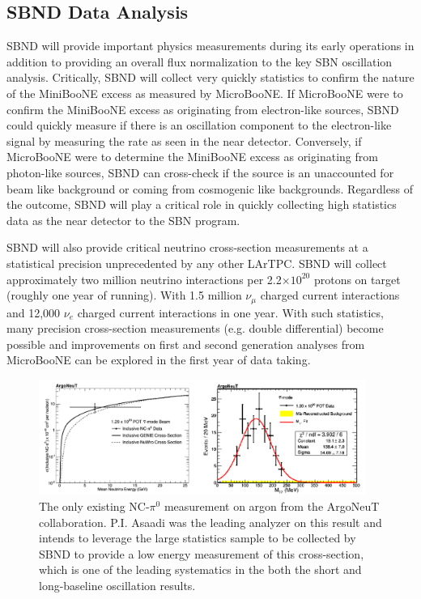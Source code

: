 \subsection{SBND Data Analysis}\label{sec:SBNDDataAnalysis}
SBND will provide important physics measurements during its early operations in addition to providing an overall flux normalization to the key SBN oscillation analysis. Critically, SBND will collect very quickly statistics to confirm the nature of the MiniBooNE excess as measured by MicroBooNE. If MicroBooNE were to confirm the MiniBooNE excess as originating from electron-like sources, SBND could quickly measure if there is an oscillation component to the electron-like signal by measuring the rate as seen in the near detector. Conversely, if MicroBooNE were to determine the MiniBooNE excess as originating from photon-like sources, SBND can cross-check if the source is an unaccounted for beam like background or coming from cosmogenic like backgrounds. Regardless of the outcome, SBND will play a critical role in quickly collecting high statistics data as the near detector to the SBN program.

SBND will also provide critical neutrino cross-section measurements at a statistical precision unprecedented by any other LArTPC. SBND will collect approximately two million neutrino interactions per 2.2$\times 10^{20}$ protons  on target (roughly one year of running). With 1.5 million $\nu_{\mu}$ charged current interactions and 12,000 $\nu_{e}$ charged current interactions in one year. With such statistics, many precision cross-section measurements (e.g. double differential) become possible and improvements on first and second generation analyses from MicroBooNE can be explored in the first year of data taking.

\begin{figure}[htb]
\centering
\includegraphics[width=0.95\textwidth]{images/ArgoNeuTPizeroResult.png}
\caption[]{The only existing NC-$\pi^0$ measurement on argon from the ArgoNeuT collaboration. P.I. Asaadi was the leading analyzer on this result and intends to leverage the large statistics sample to be collected by SBND to provide a low energy measurement of this cross-section, which is one of the leading systematics in the both the short and long-baseline oscillation results.}
\label{fig:argoneutpizero}
\end{figure} 



